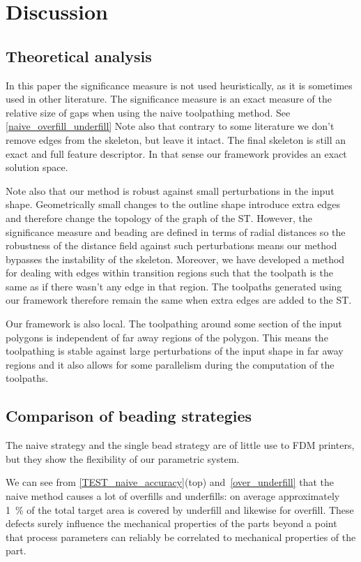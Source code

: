 \section{Discussion}

\subsection{Theoretical analysis}
In this paper the significance measure is not used heuristically, as it is sometimes used in other literature.
The significance measure is an exact measure of the relative size of gaps when using the naive toolpathing method.
See \cref{naive_overfill_underfill}
Note also that contrary to some literature we don't remove edges from the skeleton, but leave it intact.
The final skeleton is still an exact and full feature descriptor.
In that sense our framework provides an exact solution space.

Note also that our method is robust against small perturbations in the input shape.
Geometrically small changes to the outline shape introduce extra edges and therefore change the topology of the graph of the ST.
However, the significance measure and beading are defined in terms of radial distances so the robustness of the distance field against such perturbations means our method bypasses the instability of the skeleton.
Moreover, we have developed a method for dealing with edges within transition regions such that the toolpath is the same as if there wasn't any edge in that region.
The toolpaths generated using our framework therefore remain the same when extra edges are added to the ST.

Our framework is also local.
The toolpathing around some section of the input polygons is independent of far away regions of the polygon.
This means the toolpathing is stable against large perturbations of the input shape in far away regions
and it also allows for some parallelism during the computation of the toolpaths.



\subsection{Comparison of beading strategies}
The naive strategy and the single bead strategy are of little use to FDM printers, but they show the flexibility of our parametric system.

We can see from \cref{TEST_naive_accuracy}(top) and~\ref{over_underfill} that the naive method causes a lot of overfills and underfills: on average approximately \SI{1}{\percent} of the total target area is covered by underfill and likewise for overfill.
These defects surely influence the mechanical properties of the parts beyond a point that process parameters can reliably be correlated to mechanical properties of the part.

